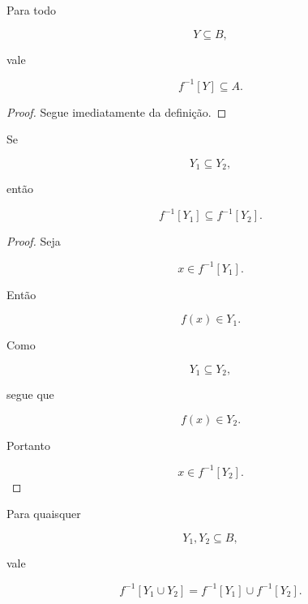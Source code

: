\documentclass[../../main]{subfiles}
\begin{document}
\begin{prop}
	\label{prop:matematica:funcoes:imagem-direta-e-inversa:imagem-inversa-subconjunto}

	Para todo

	\[
		Y\subseteq B,
	\]

	vale

	\[
		f^{-1}[Y]
		\subseteq
		A.
	\]

\end{prop}

\begin{proof}

	Segue imediatamente da definição.

\end{proof}

\begin{prop}
	\label{prop:matematica:funcoes:imagem-direta-e-inversa:monotonicidade-inversa}

	Se

	\[
		Y_1\subseteq Y_2,
	\]

	então

	\[
		f^{-1}[Y_1]
		\subseteq
		f^{-1}[Y_2].
	\]

\end{prop}

\begin{proof}

	Seja

	\[
		x\in f^{-1}[Y_1].
	\]

	Então

	\[
		f(x)\in Y_1.
	\]

	Como

	\[
		Y_1\subseteq Y_2,
	\]

	segue que

	\[
		f(x)\in Y_2.
	\]

	Portanto

	\[
		x\in f^{-1}[Y_2].
	\]

\end{proof}

\begin{prop}
	\label{prop:matematica:funcoes:imagem-direta-e-inversa:uniao-inversa}

	Para quaisquer

	\[
		Y_1,Y_2\subseteq B,
	\]

	vale

	\[
		f^{-1}[Y_1\cup Y_2]
		=
		f^{-1}[Y_1]
		\cup
		f^{-1}[Y_2].
	\]

\end{prop}
\end{document}
